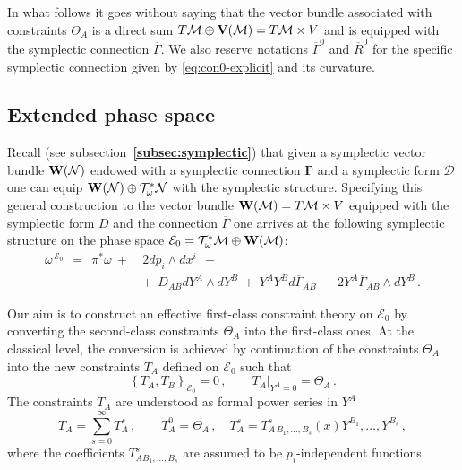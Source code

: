 \documentclass[a4paper,11pt]{amsart}
\numberwithin{thm}{section} %
\numberwithin{equation}{section} %
\numberwithin{figure}{section} %
\newcommand{\bref}[1]{{\bf \ref{#1}}}
\newcommand{\pb}[2]{\left\{{}#1{},{}#2{}\right\}}
\renewcommand{\:}{{\rm\, :\,}}
\def\bar{\overline}
\def\mod{{\mathcal T}^*_\omega}
\def\manM{{\mathcal M}}
\def\manN{{\mathcal N}}
\def\E{{ \mathcal E}}
\def\V{{\bf V}}
\def\W{{\bf W}}
\def\con{{\bar\Gamma}}
\def\mcon{{\boldsymbol\Gamma}}
\def\mD{\mathcal{D}}
\begin{document}
In what follows it goes without saying that the vector bundle
associated with constraints $\Theta_A$ is a direct sum
$T\manM \oplus \V(\manM)=T\manM \times V$ and is equipped with
the symplectic connection $\con$.  We also reserve
notations $\con^0$ and ${\bar R}^0$ for the specific symplectic
connection given by \eqref{eq:con0-explicit} and its curvature.

\subsection{Extended phase space}\label{subsec:extended-phase-space}

Recall (see subsection~\bref{subsec:symplectic}) that given
a symplectic vector bundle $\W(\manN)$ endowed with a symplectic
connection $\mcon$ and a symplectic form $\mD$ one can equip
$\W(\manN)\oplus \mod\manN$ with the symplectic structure.
Specifying this general construction to the vector bundle
$\W(\manM)=T\manM \times V$ equipped with the symplectic form $D$ and
the connection $\con$ one arrives at the following symplectic structure on
the phase space $\E_0=\mod\manM\oplus\W(\manM)$:
\begin{equation}
\label{eq:symplectic-E0}
\begin{split}
  \omega^{{\,\E_0}}~~=~~\pi^*\omega~+~&  2dp_i \wedge dx^i ~~+\\
 & +~~ D_{AB}dY^A\wedge dY^B~+~Y^A Y^B d \con_{AB}~-~2Y^A\con_{AB}
  \wedge dY^B\,.
\end{split}
\end{equation}


Our aim is to construct an effective first-class constraint theory
on $\E_0$ by converting the second-class constraints $\Theta_A$
into the first-class ones.  At the classical level, the conversion is
achieved by continuation of the constraints $\Theta_A$ into the new
constraints $T_A$ defined on $\E_0$ such that
\begin{equation}
  \label{eq:determin}
\pb{T_A}{T_B}_{\E_0}=0\,, \qquad T_A|_{Y^A=0}=\Theta_A\,.
\end{equation}
The constraints $T_A$ are understood as formal power series in $Y^A$
\begin{equation}
  T_A=\sum_{s=0}^{\infty}T^s_{A}\,,\qquad T^0_A=\Theta_A\,,\quad
  T^s_A=T^s_{A\, B_1,\ldots , B_s}(x)Y^{B_1},\ldots , Y^{B_s}\,,
  \label{eq:T-exp}
\end{equation}
where the coefficients $T^s_{A B_1,\ldots , B_s}$
are assumed to be $p_i$-independent functions.
\end{document}
